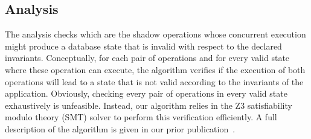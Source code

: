 \subsection{Analysis}
The analysis checks which are the shadow operations
whose concurrent execution might produce a
database state that is invalid with respect to the declared invariants.
Conceptually, for each pair of operations and for every valid state where
these operation can execute, the algorithm verifies if the execution of both
operations will lead to a state that is not valid according to the invariants
of the application.
Obviously, checking every pair of operations in every valid state
exhaustively is unfeasible. Instead, our algorithm relies in the
Z3 satisfiability modulo theory (SMT) solver to perform this verification
efficiently.
A full description of the algorithm is given in our prior publication~\cite{Balegas2015Indigo}.




